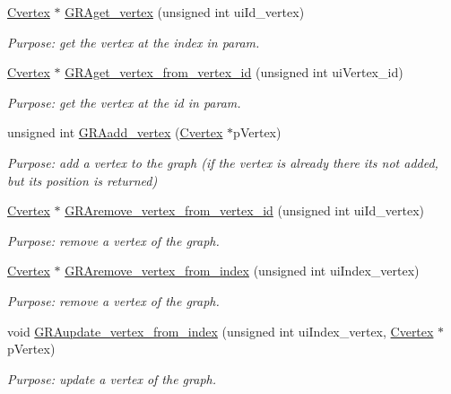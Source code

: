 \begin{DoxyCompactItemize}
\hyperlink{class_cvertex}{Cvertex} $\ast$ \hyperlink{class_cgraph_aca872915fd8745ae14ba41afbb0dec0a}{G\+R\+Aget\+\_\+vertex} (unsigned int ui\+Id\+\_\+vertex)
\begin{DoxyCompactList}\small\item\em Purpose\+: get the vertex at the index in param. \end{DoxyCompactList}\item 
\hyperlink{class_cvertex}{Cvertex} $\ast$ \hyperlink{class_cgraph_a773062af5c90eb8b3caf083265b1fefe}{G\+R\+Aget\+\_\+vertex\+\_\+from\+\_\+vertex\+\_\+id} (unsigned int ui\+Vertex\+\_\+id)
\begin{DoxyCompactList}\small\item\em Purpose\+: get the vertex at the id in param. \end{DoxyCompactList}\item 
unsigned int \hyperlink{class_cgraph_ac23521c4babdef352f7a88321032a7ec}{G\+R\+Aadd\+\_\+vertex} (\hyperlink{class_cvertex}{Cvertex} $\ast$p\+Vertex)
\begin{DoxyCompactList}\small\item\em Purpose\+: add a vertex to the graph (if the vertex is already there it\textquotesingle{}s not added, but it\textquotesingle{}s position is returned) \end{DoxyCompactList}\item 
\hyperlink{class_cvertex}{Cvertex} $\ast$ \hyperlink{class_cgraph_a476c5213ccd669ce475c6a148aa27331}{G\+R\+Aremove\+\_\+vertex\+\_\+from\+\_\+vertex\+\_\+id} (unsigned int ui\+Id\+\_\+vertex)
\begin{DoxyCompactList}\small\item\em Purpose\+: remove a vertex of the graph. \end{DoxyCompactList}\item 
\hyperlink{class_cvertex}{Cvertex} $\ast$ \hyperlink{class_cgraph_a51f8ab13bb01858f05058fbcb9be0cef}{G\+R\+Aremove\+\_\+vertex\+\_\+from\+\_\+index} (unsigned int ui\+Index\+\_\+vertex)
\begin{DoxyCompactList}\small\item\em Purpose\+: remove a vertex of the graph. \end{DoxyCompactList}\item 
void \hyperlink{class_cgraph_a7a57ff55a576088f502830da3234c685}{G\+R\+Aupdate\+\_\+vertex\+\_\+from\+\_\+index} (unsigned int ui\+Index\+\_\+vertex, \hyperlink{class_cvertex}{Cvertex} $\ast$p\+Vertex)
\begin{DoxyCompactList}\small\item\em Purpose\+: update a vertex of the graph. \end{DoxyCompactList}\item 

\end{DoxyCompactItemize}
